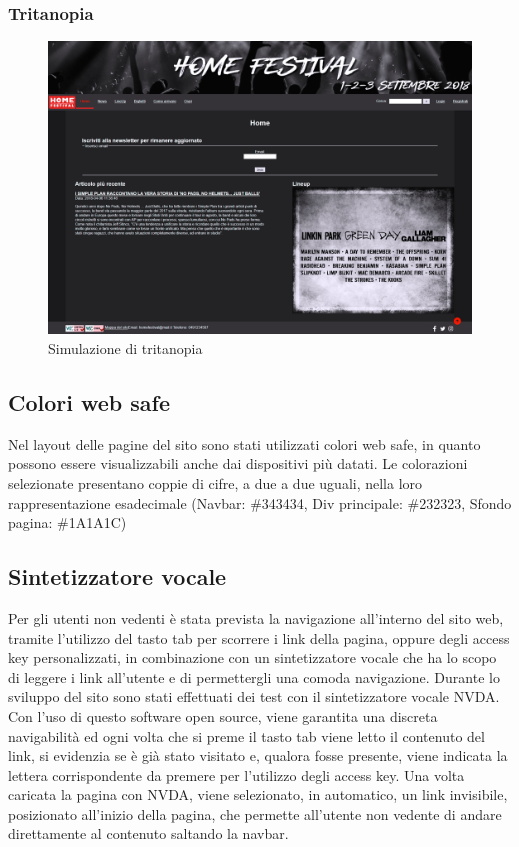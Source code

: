 \documentclass[10pt, a4paper]{article}
\begin{document}
\subsubsection{Tritanopia}

\begin{figure}[h!]
 \centering
  \includegraphics[width=1\textwidth]{Images/tritanopia.png}
  \caption{Simulazione di tritanopia}
  \label{fig:tritanopia}
\end{figure}

\subsection{Colori web safe}
Nel layout delle pagine del sito sono stati utilizzati colori web safe, in quanto possono essere visualizzabili anche dai dispositivi più datati. Le colorazioni selezionate presentano coppie di cifre, a due a due uguali, nella loro rappresentazione esadecimale (Navbar: \#343434, Div principale: \#232323, Sfondo pagina: \#1A1A1C)

\subsection{Sintetizzatore vocale}
Per gli utenti non vedenti è stata prevista la navigazione all’interno del sito web, tramite l’utilizzo del tasto tab per scorrere i link della pagina, oppure degli access key personalizzati, in combinazione con un sintetizzatore vocale che ha lo scopo di leggere i link all’utente e di permettergli una comoda navigazione.
Durante lo sviluppo del sito sono stati effettuati dei test con il sintetizzatore vocale NVDA. Con l’uso di questo software open source, viene garantita una discreta navigabilità ed ogni volta che si preme il tasto tab viene letto il contenuto del link, si evidenzia se è già stato visitato e, qualora fosse presente, viene indicata la lettera corrispondente da premere per l’utilizzo degli access key. Una volta caricata la pagina con NVDA, viene selezionato, in automatico, un link invisibile, posizionato all'inizio della pagina, che permette all’utente non vedente di andare direttamente al contenuto saltando la navbar.
\end{document}
